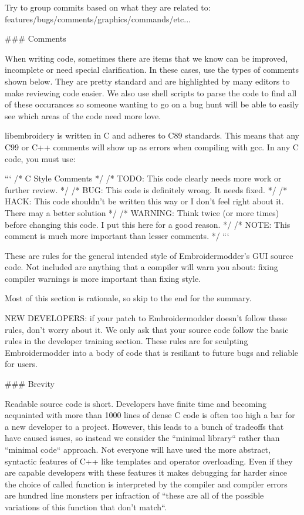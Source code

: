 Try to group commits based on what they are related to: features/bugs/comments/graphics/commands/etc...

### Comments

When writing code, sometimes there are items that we know can be improved,
incomplete or need special clarification. In these cases, use the types of
comments shown below. They are pretty standard and are highlighted by many editors to
make reviewing code easier. We also use shell scripts to parse the code to find
all of these occurances so someone wanting to go on a bug hunt will be able to
easily see which areas of the code need more love.

libembroidery is written in C and adheres to C89 standards. This means
that any C99 or C++ comments will show up as errors when compiling with
gcc. In any C code, you must use:

```
/* C Style Comments */
/* TODO: This code clearly needs more work or further review. */
/* BUG: This code is definitely wrong. It needs fixed. */
/* HACK: This code shouldn't be written this way or I don't feel right about it. There may a better solution */
/* WARNING: Think twice (or more times) before changing this code. I put this here for a good reason. */
/* NOTE: This comment is much more important than lesser comments. */
```

These are rules for the general intended style of Embroidermodder's GUI source
code. Not included are anything that a compiler will warn you about: fixing
compiler warnings is more important than fixing style.

Most of this section is rationale, so skip to the end for the summary.

NEW DEVELOPERS: if your patch to Embroidermodder doesn't follow these rules,
don't worry about it. We only ask that your source code follow the basic rules
in the developer training section. These rules are for sculpting Embroidermodder
into a body of code that is resiliant to future bugs and reliable for users.

### Brevity

Readable source code is short. Developers have finite time and becoming
acquainted with more than 1000 lines of dense C code is often too high a bar
for a new developer to a project. However, this leads to a bunch of tradeoffs
that have caused issues, so instead we consider the ``minimal library``
rather than ``minimal code`` approach. Not everyone will have used the more
abstract, syntactic features of C++ like templates and operator overloading.
Even if they are capable developers with these features it makes debugging far
harder since the choice of called function is interpreted by the compiler and compiler
errors are hundred line monsters per infraction of ``these are all of the possible
variations of this function that don't match``.

